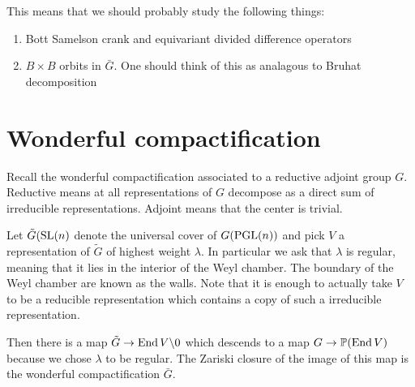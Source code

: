 \documentclass[12pt]{article}
\begin{document}
\hfill

This means that we should probably study the following things:
\begin{enumerate}
	\item Bott Samelson crank and equivariant divided difference operators
	\item $B\times B$ orbits in $\bar G$. One should think of this as analagous to Bruhat decomposition
\end{enumerate}

\section{Wonderful compactification}
Recall the wonderful compactification associated to a reductive adjoint group $G$. Reductive means at all
representations of $G$ decompose as a direct sum of irreducible representations. Adjoint means that the center 
is trivial.

\hfill

Let $\tilde G (\operatorname{SL}(n)$ denote the universal cover of $G (\operatorname{PGL}(n))$ and pick $V$ a representation of $\tilde G$ of 
highest weight $\lambda$. In particular we ask that $\lambda$ is regular, meaning that it lies in 
the interior of the Weyl chamber. The boundary of the Weyl chamber are known as the walls. Note that it is enough
to actually take $V$ to be a reducible representation which contains a copy of such a irreducible representation.

Then there is a map $\tilde G \to \operatorname{End} V \backslash 0$ which descends to a map $G \to \mathbb{P}(\operatorname{End} V)$ because we 
chose $\lambda$ to be regular. The Zariski closure of the image of this map is the wonderful compactification $\bar G$.

\begin{example}[$\PGL(3)$]
\end{example}
    
\end{document}
